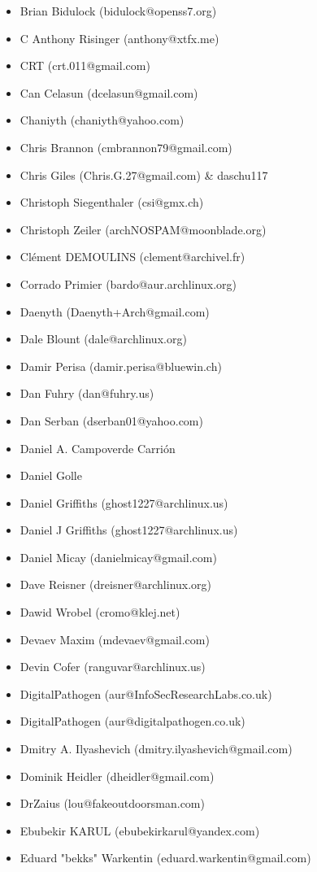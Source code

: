 \begin{itemize}
\item  Brian Bidulock (bidulock@openss7.org)
\item  C Anthony Risinger (anthony@xtfx.me)
\item  CRT (crt.011@gmail.com)
\item  Can Celasun (dcelasun@gmail.com)
\item  Chaniyth (chaniyth@yahoo.com)
\item  Chris Brannon (cmbrannon79@gmail.com)
\item  Chris Giles (Chris.G.27@gmail.com) \& daschu117
\item  Christoph Siegenthaler (csi@gmx.ch)
\item  Christoph Zeiler (archNOSPAM@moonblade.org)
\item  Clément DEMOULINS (clement@archivel.fr)
\item  Corrado Primier (bardo@aur.archlinux.org)
\item  Daenyth (Daenyth+Arch@gmail.com)
\item  Dale Blount (dale@archlinux.org)
\item  Damir Perisa (damir.perisa@bluewin.ch)
\item  Dan Fuhry (dan@fuhry.us)
\item  Dan Serban (dserban01@yahoo.com)
\item  Daniel A. Campoverde Carrión
\item  Daniel Golle
\item  Daniel Griffiths (ghost1227@archlinux.us)
\item  Daniel J Griffiths (ghost1227@archlinux.us)
\item  Daniel Micay (danielmicay@gmail.com)
\item  Dave Reisner (dreisner@archlinux.org)
\item  Dawid Wrobel (cromo@klej.net)
\item  Devaev Maxim (mdevaev@gmail.com)
\item  Devin Cofer (ranguvar@archlinux.us)
\item  DigitalPathogen (aur@InfoSecResearchLabs.co.uk)
\item  DigitalPathogen (aur@digitalpathogen.co.uk)
\item  Dmitry A. Ilyashevich (dmitry.ilyashevich@gmail.com)
\item  Dominik Heidler (dheidler@gmail.com)
\item  DrZaius (lou@fakeoutdoorsman.com)
\item  Ebubekir KARUL (ebubekirkarul@yandex.com)
\item  Eduard "bekks" Warkentin (eduard.warkentin@gmail.com)

\end{itemize}
